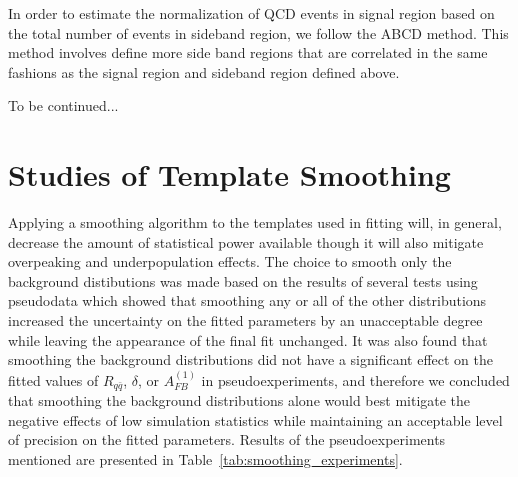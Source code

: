 \documentclass{cmspaperpdf}
\begin{document}
In order to estimate the normalization of QCD events in signal region based on the total number of events in sideband region, we follow the ABCD method. This method involves define more side band regions that are correlated in the same fashions as the signal region and sideband region defined above. 

To be continued...


\section{Studies of Template Smoothing}
\label{appsec:smoothing}

Applying a smoothing algorithm to the templates used in fitting will, in general, decrease the amount of statistical power available though it will also mitigate overpeaking and underpopulation effects. The choice to smooth only the background distibutions was made based on the results of several tests using pseudodata which showed that smoothing any or all of the other distributions increased the uncertainty on the fitted parameters by an unacceptable degree while leaving the appearance of the final fit unchanged. It was also found that smoothing the background distributions did not have a significant effect on the fitted values of $R_{q\bar q}$, $\delta$, or $A^{(1)}_{FB}$ in pseudoexperiments, and therefore we concluded that smoothing the background distributions alone would best mitigate the negative effects of low simulation statistics while maintaining an acceptable level of precision on the fitted parameters. Results of the pseudoexperiments mentioned are presented in Table~\ref{tab:smoothing_experiments}.
\end{document}
